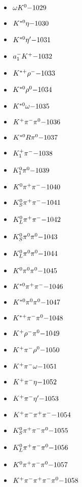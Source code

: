 \begin{multicols}{3}
\begin{itemize}
 \item $ \omega K^{0} \hfill{-1029}$
 \item $ K^{*0} \eta \hfill{-1030}$
 \item $ K^{*0} {\eta^{\prime}} \hfill{-1031}$
 \item $ a_{1}^{-} K^{+} \hfill{-1032}$
 \item $ K^{*+} \rho^{-} \hfill{-1033}$
 \item $ K^{*0} \rho^{0} \hfill{-1034}$
 \item $ K^{*0} \omega \hfill{-1035}$
 \item $ K^{+} \pi^{-} \pi^{0} \hfill{-1036}$
 \item $ K^{*0}R \pi^{0} \hfill{-1037}$
 \item $ K_{1}^{+} \pi^{-} \hfill{-1038}$
 \item $ K_{1}^{0} \pi^{0} \hfill{-1039}$
 \item $ K^{0} \pi^{+} \pi^{-} \hfill{-1040}$
 \item $ K_{S}^{0} \pi^{+} \pi^{-} \hfill{-1041}$
 \item $ K_{L}^{0} \pi^{+} \pi^{-} \hfill{-1042}$
 \item $ K_{S}^{0} \pi^{0} \pi^{0} \hfill{-1043}$
 \item $ K_{L}^{0} \pi^{0} \pi^{0} \hfill{-1044}$
 \item $ K^{0} \pi^{0} \pi^{0} \hfill{-1045}$
 \item $ K^{*0} \pi^{+} \pi^{-} \hfill{-1046}$
 \item $ K^{*0} \pi^{0} \pi^{0} \hfill{-1047}$
 \item $ K^{*+} \pi^{-} \pi^{0} \hfill{-1048}$
 \item $ K^{+} \rho^{-} \pi^{0} \hfill{-1049}$
 \item $ K^{+} \pi^{-} \rho^{0} \hfill{-1050}$
 \item $ K^{+} \pi^{-} \omega \hfill{-1051}$
 \item $ K^{+} \pi^{-} \eta \hfill{-1052}$
 \item $ K^{+} \pi^{-} {\eta^{\prime}} \hfill{-1053}$
 \item $ K^{+} \pi^{-} \pi^{+} \pi^{-} \hfill{-1054}$
 \item $ K_{S}^{0} \pi^{+} \pi^{-} \pi^{0} \hfill{-1055}$
 \item $ K_{L}^{0} \pi^{+} \pi^{-} \pi^{0} \hfill{-1056}$
 \item $ K^{0} \pi^{+} \pi^{-} \pi^{0} \hfill{-1057}$
 \item $ K^{+} \pi^{-} \pi^{+} \pi^{-} \pi^{0} \hfill{-1058}$

\end{itemize}
\end{multicols}
